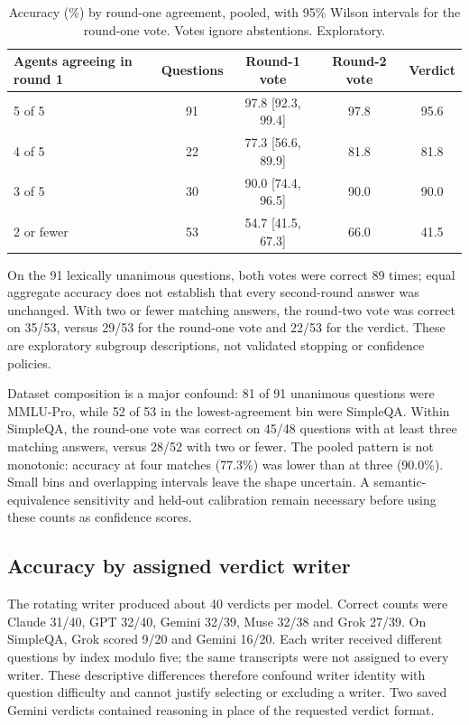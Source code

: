 \documentclass[11pt]{article}
\begin{document}
\begin{table}[t]
\centering
\begin{tabular}{lcccc}
\toprule
Agents agreeing in round 1 & Questions & Round-1 vote & Round-2 vote & Verdict \\
\midrule
5 of 5 & 91 & 97.8 [92.3, 99.4] & 97.8 & 95.6 \\
4 of 5 & 22 & 77.3 [56.6, 89.9] & 81.8 & 81.8 \\
3 of 5 & 30 & 90.0 [74.4, 96.5] & 90.0 & 90.0 \\
2 or fewer & 53 & 54.7 [41.5, 67.3] & 66.0 & 41.5 \\
\bottomrule
\end{tabular}
\caption{Accuracy (\%) by round-one agreement, pooled, with 95\% Wilson intervals for the round-one vote. Votes ignore abstentions. Exploratory.}
\label{tab:agree}
\end{table}

On the 91 lexically unanimous questions, both votes were correct 89 times; equal aggregate accuracy does not establish that every second-round answer was unchanged. With two or fewer matching answers, the round-two vote was correct on 35/53, versus 29/53 for the round-one vote and 22/53 for the verdict. These are exploratory subgroup descriptions, not validated stopping or confidence policies.

Dataset composition is a major confound: 81 of 91 unanimous questions were MMLU-Pro, while 52 of 53 in the lowest-agreement bin were SimpleQA. Within SimpleQA, the round-one vote was correct on 45/48 questions with at least three matching answers, versus 28/52 with two or fewer. The pooled pattern is not monotonic: accuracy at four matches (77.3\%) was lower than at three (90.0\%). Small bins and overlapping intervals leave the shape uncertain. A semantic-equivalence sensitivity and held-out calibration remain necessary before using these counts as confidence scores.

\subsection{Accuracy by assigned verdict writer}
\label{sec:judge}
The rotating writer produced about 40 verdicts per model. Correct counts were Claude 31/40, GPT 32/40, Gemini 32/39, Muse 32/38 and Grok 27/39. On SimpleQA, Grok scored 9/20 and Gemini 16/20. Each writer received different questions by index modulo five; the same transcripts were not assigned to every writer. These descriptive differences therefore confound writer identity with question difficulty and cannot justify selecting or excluding a writer. Two saved Gemini verdicts contained reasoning in place of the requested verdict format.
\end{document}
